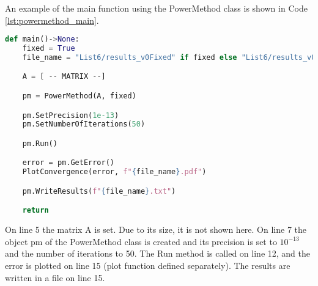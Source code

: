 An example of the main function using the PowerMethod class is shown in Code \ref{lst:powermethod_main}.
\begin{lstlisting}[caption={PowerMethod main function}, label={lst:powermethod_main}, language=python]
def main()->None:
    fixed = True
    file_name = "List6/results_v0Fixed" if fixed else "List6/results_v0Variable" 

    A = [ -- MATRIX --]

    pm = PowerMethod(A, fixed)

    pm.SetPrecision(1e-13)
    pm.SetNumberOfIterations(50)

    pm.Run()

    error = pm.GetError()
    PlotConvergence(error, f"{file_name}.pdf")

    pm.WriteResults(f"{file_name}.txt")

    return 
\end{lstlisting}

On line 5 the matrix A is set. Due to its size, it is not shown here. On line 7 the object pm of the PowerMethod class is created and its precision is set to $10^{-13}$ and the number of iterations to 50. The Run method is called on line 12, and the error is plotted on line 15 (plot function defined separately). The results are written in a file on line 15.